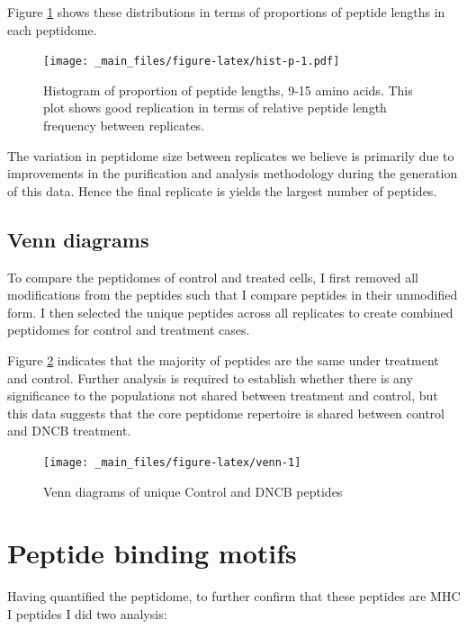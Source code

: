 \documentclass[12pt,]{book}
\begin{document}
Figure \ref{fig:hist-p} shows these distributions in terms of
proportions of peptide lengths in each peptidome.

\begin{figure}
\centering
\texttt{[image: \_main\_files/figure-latex/hist-p-1.pdf]}
\caption{\label{fig:hist-p}Histogram of proportion of peptide lengths, 9-15 amino
acids. This plot shows good replication in terms of relative peptide
length frequency between replicates.}
\end{figure}

The variation in peptidome size between replicates we believe is
primarily due to improvements in the purification and analysis
methodology during the generation of this data. Hence the final
replicate is yields the largest number of peptides.

\section{Venn diagrams}\label{venn-diagrams}

To compare the peptidomes of control and treated cells, I first removed
all modifications from the peptides such that I compare peptides in
their unmodified form. I then selected the unique peptides across all
replicates to create combined peptidomes for control and treatment
cases.

Figure \ref{fig:venn} indicates that the majority of peptides are the
same under treatment and control. Further analysis is required to
establish whether there is any significance to the populations not
shared between treatment and control, but this data suggests that the
core peptidome repertoire is shared between control and DNCB treatment.



\begin{figure}

{\centering \texttt{[image: \_main\_files/figure-latex/venn-1]} 

}

\caption{Venn diagrams of unique Control and DNCB peptides}\label{fig:venn}
\end{figure}

\hypertarget{peptide-binding-motifs}{\chapter{Peptide binding
motifs}\label{peptide-binding-motifs}}

Having quantified the peptidome, to further confirm that these peptides
are MHC I peptides I did two analysis:
\end{document}
